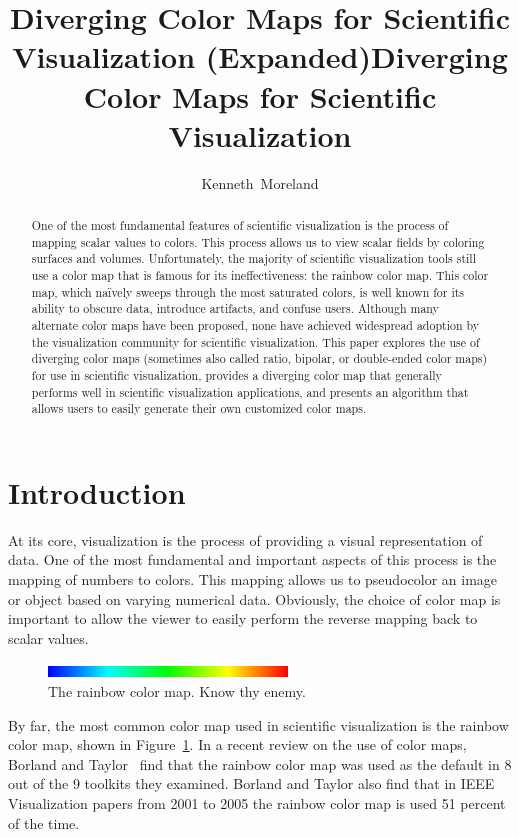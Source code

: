 \documentclass{llncs}
\title{Diverging Color Maps for Scientific Visualization (Expanded)}
\title{Diverging Color Maps for Scientific Visualization}
\author{Kenneth~Moreland}
\institute{Sandia National Laboratories}
\newcommand{\scite}[1]{~\cite{#1}}
\begin{document}
\sloppy

\maketitle

\begin{abstract}
  One of the most fundamental features of scientific visualization is the
  process of mapping scalar values to colors.  This process allows us to
  view scalar fields by coloring surfaces and volumes.  Unfortunately, the
  majority of scientific visualization tools still use a color map that is
  famous for its ineffectiveness: the rainbow color map.  This color map,
  which na\"{i}vely sweeps through the most saturated colors, is well known
  for its ability to obscure data, introduce artifacts, and confuse users.
  Although many alternate color maps have been proposed, none have achieved
  widespread adoption by the visualization community for scientific
  visualization.  This paper explores the use of diverging color maps
  (sometimes also called ratio, bipolar, or double-ended color maps) for
  use in scientific visualization, provides a diverging color map that
  generally performs well in scientific visualization applications, and
  presents an algorithm that allows users to easily generate their own
  customized color maps.
\end{abstract}

\section{Introduction}
\label{sec:Introduction}

At its core, visualization is the process of providing a visual
representation of data.  One of the most fundamental and important aspects
of this process is the mapping of numbers to colors.  This mapping allows
us to pseudocolor an image or object based on varying numerical data.
Obviously, the choice of color map is important to allow the viewer to
easily perform the reverse mapping back to scalar values.

\begin{figure}
  \centering
  \includegraphics[width=2.5in]{images/RainbowBar}
  \caption{The rainbow color map.  Know thy enemy.}
  \label{fig:RainbowColorMap}
\end{figure}

By far, the most common color map used in scientific visualization is the
rainbow color map, shown in Figure~\ref{fig:RainbowColorMap}.  In a recent
review on the use of color maps, Borland and Taylor\scite{Borland07} find
that the rainbow color map was used as the default in 8 out of the 9
toolkits they examined.  Borland and Taylor also find that in IEEE
Visualization papers from 2001 to 2005 the rainbow color map is used 51
percent of the time.
\end{document}
